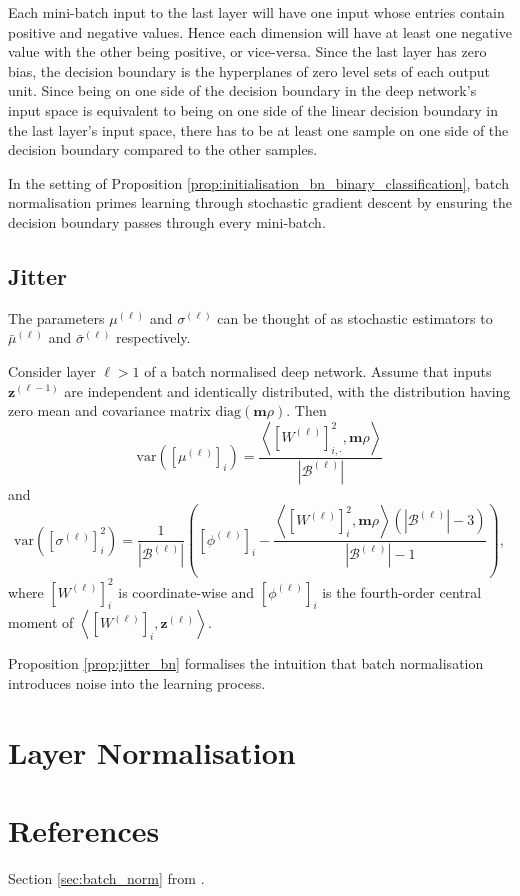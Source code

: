 \begin{tproof}
    Each mini-batch input to the last layer will have one input whose entries contain positive and negative values. Hence each dimension will have at least one negative value with the other being positive, or vice-versa. Since the last layer has zero bias, the decision boundary is the hyperplanes of zero level sets of each output unit. Since being on one side of the decision boundary in the deep network's input space is equivalent to being on one side of the linear decision boundary in the last layer's input space, there has to be at least one sample on one side of the decision boundary compared to the other samples.
\end{tproof}

In the setting of Proposition \ref{prop:initialisation_bn_binary_classification}, batch normalisation primes learning through stochastic gradient descent by ensuring the decision boundary passes through every mini-batch.

\subsection{Jitter}

The parameters $\mu^{(\ell)}$ and $\sigma^{(\ell)}$ can be thought of as stochastic estimators to $\bar{\mu}^{(\ell)}$ and $\bar{\sigma}^{(\ell)}$ respectively.

\begin{proposition}\label{prop:jitter_bn}
    Consider layer $\ell>1$ of a batch normalised deep network. Assume that inputs $\mathbf{z}^{(\ell-1)}$ are independent and identically distributed, with the distribution having zero mean and covariance matrix $\mathrm{diag}(\mathbf{m}\rho)$. Then $$\mathrm{var}\left(\left[\mu^{(\ell)}\right]_i\right)=\frac{\left\langle\left[W^{(\ell)}\right]_{i,\cdot}^2,\mathbf{m}\rho\right\rangle}{\left\vert\mathcal{B}^{(\ell)}\right\vert}$$and$$\mathrm{var}\left(\left[\sigma^{(\ell)}\right]_i^2\right)=\frac{1}{\left\vert\mathcal{B}^{(\ell)}\right\vert}\left(\left[\phi^{(\ell)}\right]_i-\frac{\left\langle\left[W^{(\ell)}\right]_i^2,\mathbf{m}\rho\right\rangle\left(\left\vert\mathcal{B}^{(\ell)}\right\vert-3\right)}{\left\vert\mathcal{B}^{(\ell)}\right\vert-1}\right),$$where $\left[W^{(\ell)}\right]_i^2$ is coordinate-wise and $\left[\phi^{(\ell)}\right]_i$ is the fourth-order central moment of $\left\langle\left[W^{(\ell)}\right]_i,\mathbf{z}^{(\ell)}\right\rangle$.
\end{proposition}

Proposition \ref{prop:jitter_bn} formalises the intuition that batch normalisation introduces noise into the learning process. 

\section{Layer Normalisation}

\section{References}

Section \ref{sec:batch_norm} from \citet{balestrieroBatchNormalizationExplained2022}.
